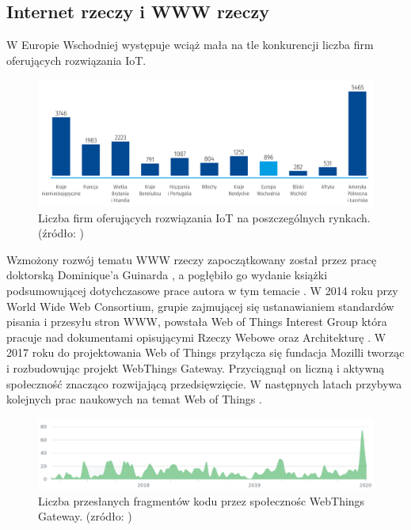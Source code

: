 \documentclass[11pt]{report}
\begin{document}
 \subsection{Internet rzeczy i WWW rzeczy}
 W Europie Wschodniej występuje wciąż mała na tle konkurencji liczba firm oferujących rozwiązania IoT.
  \begin{figure}[ht]
\centering
\includegraphics[width=0.8 \textwidth]{fig/liczba_firm_rozwiazania_iot.png}
\caption{Liczba firm oferujących rozwiązania IoT na poszczególnych rynkach. (źródło: \cite{gov2019})}
\label{fig:firmy}
\end{figure}
 Wzmożony rozwój tematu WWW rzeczy zapoczątkowany został przez pracę doktorską Dominique'a Guinarda \cite{Guinard2011}, a pogłębiło go wydanie książki \cite{Guinard2017} podsumowującej dotychczasowe prace autora w tym temacie \cite{Guinard2009} \cite{Guinard2010} \cite{Guinard2010a} \cite{Guinard2011} \cite{Guinard2011a}.
 W 2014 roku przy World Wide Web Consortium, grupie zajmującej się ustanawianiem standardów pisania i przesyłu stron WWW, powstała Web of Things Interest Group \cite{wotig2014} która pracuje nad dokumentami opisującymi Rzeczy Webowe \cite{thingdescription} oraz Architekturę \cite{wotarchitecture}.
 W 2017 roku do projektowania Web of Things przyłącza się fundacja Mozilli \cite{mozilla2017} tworząc i rozbudowując projekt WebThings Gateway. Przyciągnął on liczną i aktywną społeczność znacząco rozwijającą przedsięwzięcie.  W następnych latach przybywa kolejnych prac naukowych na temat Web of Things \cite{IEEE2018} \cite{Raggett2018} \cite{Korkan2019}.
   \begin{figure}[ht]
\centering
\includegraphics[width=0.8 \textwidth]{fig/contributions.png}
\caption{Liczba przesłanych fragmentów kodu przez społecznośc WebThings Gateway. (zródło: \cite{gatewaycommits2020})}
\label{fig:contributions}
\end{figure}
\end{document}
